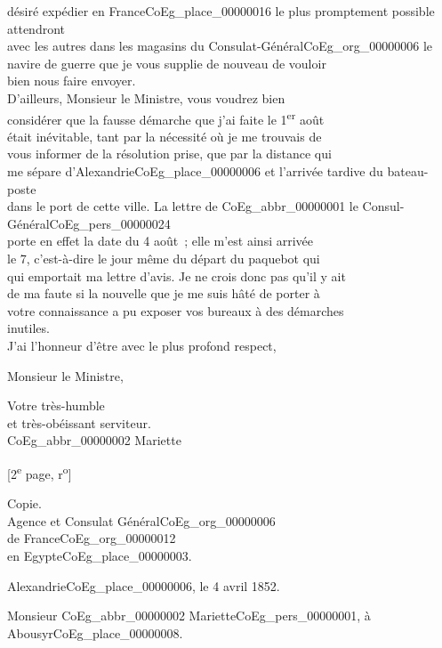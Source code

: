 \documentclass{book}
\begin{document}
désiré expédier en France\gls{CoEg_place_00000016} le plus promptement possible attendront\\
avec les autres dans les magasins du Consulat-Général\gls{CoEg_org_00000006} le\\
navire de guerre que je vous supplie de nouveau de vouloir\\
bien nous faire envoyer.\\
\indent D’ailleurs, Monsieur le Ministre, vous voudrez bien\\
considérer que la fausse démarche que j’ai faite le 1\textsuperscript{er} août\\
était inévitable, tant par la nécessité où je me trouvais de\\
vous informer de la résolution prise, que par la distance qui\\
me sépare d’Alexandrie\gls{CoEg_place_00000006} et l’arrivée tardive du bateau-poste\\
dans le port de cette ville. La lettre de \gls{CoEg_abbr_00000001} le Consul-Général\gls{CoEg_pers_00000024}\\
porte en effet la date du 4 août~; elle m’est ainsi arrivée\\
le 7, c’est-à-dire le jour même du départ du paquebot qui\\
qui emportait ma lettre d’avis. Je ne crois donc pas qu’il y ait\\
de ma faute si la nouvelle que je me suis hâté de porter à\\
votre connaissance a pu exposer vos bureaux à des démarches\\
inutiles.\\
\indent J’ai l’honneur d’être avec le plus profond respect,
\begin{center} Monsieur le Ministre,\end{center}
\begin{center}\hspace{5cm} Votre très-humble\\
\hspace{5cm} et très-obéissant serviteur.\\
\hspace{5cm} \gls{CoEg_abbr_00000002} Mariette\end{center}
{\footnotesize \begin{center} {[2\textsuperscript{e} page, r\textsuperscript{o}]}\end{center}}
Copie.\\
Agence et Consulat Général\gls{CoEg_org_00000006}\\
\hspace{3cm} de France\gls{CoEg_org_00000012}\\
\hspace{3cm} en Egypte\gls{CoEg_place_00000003}.
\begin{flushright}Alexandrie\gls{CoEg_place_00000006}, le 4 avril 1852.\end{flushright}
\begin{flushright}Monsieur \gls{CoEg_abbr_00000002} Mariette\gls{CoEg_pers_00000001}, à Abousyr\gls{CoEg_place_00000008}.\end{flushright}
\end{document}
